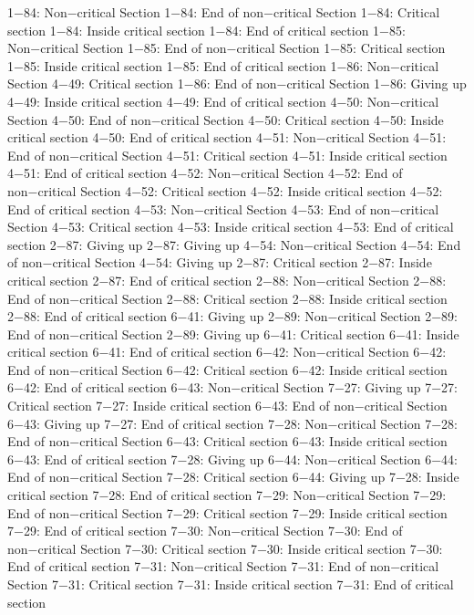 1−84: Non−critical Section
1−84: End of non−critical Section
1−84: Critical section
1−84: Inside critical section
1−84: End of critical section
1−85: Non−critical Section
1−85: End of non−critical Section
1−85: Critical section
1−85: Inside critical section
1−85: End of critical section
1−86: Non−critical Section
4−49: Critical section
1−86: End of non−critical Section
1−86: Giving up
4−49: Inside critical section
4−49: End of critical section
4−50: Non−critical Section
4−50: End of non−critical Section
4−50: Critical section
4−50: Inside critical section
4−50: End of critical section
4−51: Non−critical Section
4−51: End of non−critical Section
4−51: Critical section
4−51: Inside critical section
4−51: End of critical section
4−52: Non−critical Section
4−52: End of non−critical Section
4−52: Critical section
4−52: Inside critical section
4−52: End of critical section
4−53: Non−critical Section
4−53: End of non−critical Section
4−53: Critical section
4−53: Inside critical section
4−53: End of critical section
2−87: Giving up
2−87: Giving up
4−54: Non−critical Section
4−54: End of non−critical Section
4−54: Giving up
2−87: Critical section
2−87: Inside critical section
2−87: End of critical section
2−88: Non−critical Section
2−88: End of non−critical Section
2−88: Critical section
2−88: Inside critical section
2−88: End of critical section
6−41: Giving up
2−89: Non−critical Section
2−89: End of non−critical Section
2−89: Giving up
6−41: Critical section
6−41: Inside critical section
6−41: End of critical section
6−42: Non−critical Section
6−42: End of non−critical Section
6−42: Critical section
6−42: Inside critical section
6−42: End of critical section
6−43: Non−critical Section
7−27: Giving up
7−27: Critical section
7−27: Inside critical section
6−43: End of non−critical Section
6−43: Giving up
7−27: End of critical section
7−28: Non−critical Section
7−28: End of non−critical Section
6−43: Critical section
6−43: Inside critical section
6−43: End of critical section
7−28: Giving up
6−44: Non−critical Section
6−44: End of non−critical Section
7−28: Critical section
6−44: Giving up
7−28: Inside critical section
7−28: End of critical section
7−29: Non−critical Section
7−29: End of non−critical Section
7−29: Critical section
7−29: Inside critical section
7−29: End of critical section
7−30: Non−critical Section
7−30: End of non−critical Section
7−30: Critical section
7−30: Inside critical section
7−30: End of critical section
7−31: Non−critical Section
7−31: End of non−critical Section
7−31: Critical section
7−31: Inside critical section
7−31: End of critical section
